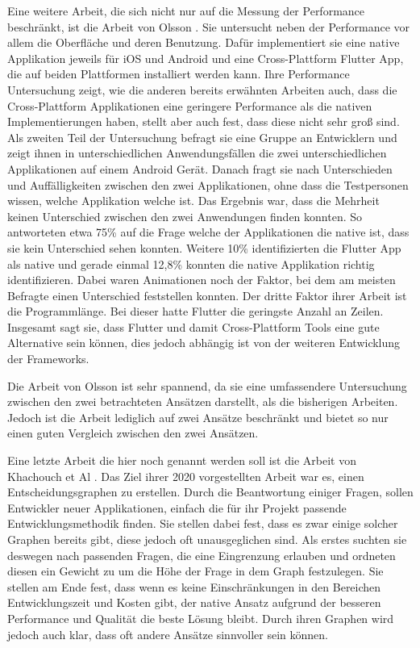 Eine weitere Arbeit, die sich nicht nur auf die Messung der Performance beschränkt, ist die Arbeit von Olsson \cite{Olsson_2020}. Sie untersucht neben der Performance vor allem die Oberfläche und deren Benutzung. Dafür implementiert sie eine native Applikation jeweils für iOS und Android und eine Cross-Plattform Flutter App, die auf beiden Plattformen installiert werden kann. Ihre Performance Untersuchung zeigt, wie die anderen bereits erwähnten Arbeiten auch, dass die Cross-Plattform Applikationen eine geringere Performance als die nativen Implementierungen haben, stellt aber auch fest, dass diese nicht sehr groß sind. Als zweiten Teil der Untersuchung befragt sie eine Gruppe an Entwicklern und zeigt ihnen in unterschiedlichen Anwendungsfällen die zwei unterschiedlichen Applikationen auf einem Android Gerät. Danach fragt sie nach Unterschieden und Auffälligkeiten zwischen den zwei Applikationen, ohne dass die Testpersonen wissen, welche Applikation welche ist. Das Ergebnis war, dass die Mehrheit keinen Unterschied zwischen den zwei Anwendungen finden konnten. So antworteten etwa 75\% auf die Frage welche der Applikationen die native ist, dass sie kein Unterschied sehen konnten. Weitere 10\% identifizierten die Flutter App als native und gerade einmal 12,8\% konnten die native Applikation richtig identifizieren. Dabei waren Animationen noch der Faktor, bei dem am meisten Befragte einen Unterschied feststellen konnten. Der dritte Faktor ihrer Arbeit ist die Programmlänge. Bei dieser hatte Flutter die geringste Anzahl an Zeilen. Insgesamt sagt sie, dass Flutter und damit Cross-Plattform Tools eine gute Alternative sein können, dies jedoch abhängig ist von der weiteren Entwicklung der Frameworks.

Die Arbeit von Olsson ist sehr spannend, da sie eine umfassendere Untersuchung zwischen den zwei betrachteten Ansätzen darstellt, als die bisherigen Arbeiten. Jedoch ist die Arbeit lediglich auf zwei Ansätze beschränkt und bietet so nur einen guten Vergleich zwischen den zwei Ansätzen.

Eine letzte Arbeit die hier noch genannt werden soll ist die Arbeit von Khachouch et Al \cite{IEEE_Khackouch_Al}. Das Ziel ihrer 2020 vorgestellten Arbeit war es, einen Entscheidungsgraphen zu erstellen. Durch die Beantwortung einiger Fragen, sollen Entwickler neuer Applikationen, einfach die für ihr Projekt passende Entwicklungsmethodik finden. Sie stellen dabei fest, dass es zwar einige solcher Graphen bereits gibt, diese jedoch oft unausgeglichen sind.
Als erstes suchten sie deswegen nach passenden Fragen, die eine Eingrenzung erlauben und ordneten diesen ein Gewicht zu um die Höhe der Frage in dem Graph festzulegen. Sie stellen am Ende fest, dass wenn es keine Einschränkungen in den Bereichen Entwicklungszeit und Kosten gibt, der native Ansatz aufgrund der besseren Performance und Qualität die beste Lösung bleibt. Durch ihren Graphen wird jedoch auch klar, dass oft andere Ansätze sinnvoller sein können.

